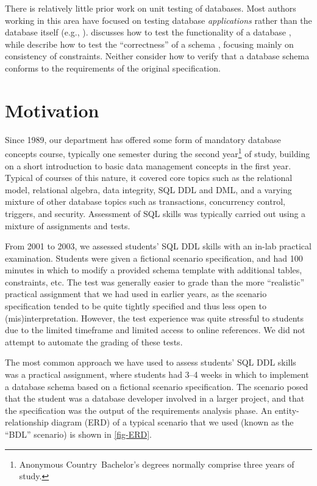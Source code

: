 \documentclass[sigconf, review, anonymous, capitalise]{acmart}
\newcommand{\anoncountry}{Anonymous Country}
\begin{document}
There is relatively little prior work on unit testing of databases. Most authors working in this area have focused on testing database \emph{applications} rather than the database itself (e.g., \cite{Binnig.C-2008a-Multi-RQP,Chays.D-2008a-Query-based,Marcozzi.M-2012a-Test,Haller.K-2010a-Test}). \citeauthor{Ambler.S-2006a-Database} discusses how to test the functionality of a database \cite{Ambler.S-2006a-Database}, while \citeauthor{Farre.C-2008a-SVTe} describe how to test the ``correctness'' of a schema \cite{Farre.C-2008a-SVTe}, focusing mainly on consistency of constraints. Neither consider how to verify that a database schema conforms to the requirements of the original specification.


\section{Motivation}
\label{sec-motivation}

Since 1989, our department has offered some form of mandatory database concepts course, typically one semester during the second year\footnote{\anoncountry\ Bachelor's degrees normally comprise three years of study.} of study, building on a short introduction to basic data management concepts in the first year. Typical of courses of this nature, it covered core topics such as the relational model, relational algebra, data integrity, SQL DDL and DML, and a varying mixture of other database topics such as transactions, concurrency control, triggers, and security. Assessment of SQL skills was typically carried out using a mixture of assignments and tests.

From 2001 to 2003, we assessed students' SQL DDL skills with an in-lab practical examination. Students were given a fictional scenario specification, and had 100 minutes in which to modify a provided schema template with additional tables, constraints, etc. The test was generally easier to grade than the more ``realistic'' practical assignment that we had used in earlier years, as the scenario specification tended to be quite tightly specified and thus less open to (mis)interpretation. However, the test experience was quite stressful to students due to the limited timeframe and limited access to online references. We did not attempt to automate the grading of these tests.

The most common approach we have used to assess students' SQL DDL skills was a practical assignment, where students had 3--4 weeks in which to implement a database schema based on a fictional scenario specification. The scenario posed that the student was a database developer involved in a larger project, and that the specification was the output of the requirements analysis phase. An entity-relationship diagram (ERD) of a typical scenario that we used (known as the ``BDL'' scenario) is shown in \cref{fig-ERD}.
 
\end{document}
